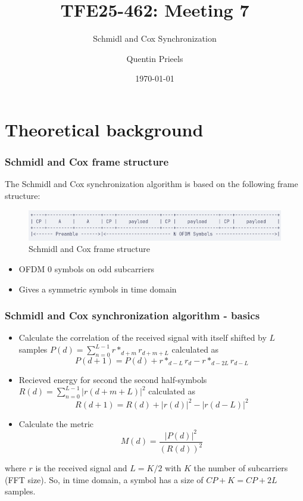\documentclass[10pt]{beamer}
\title{TFE25-462: Meeting 7}
\subtitle{Schmidl and Cox Synchronization}
\author{Quentin Prieels}
\date{\today}
\begin{document}
\maketitle


\section{Theoretical background}

\begin{frame}
    \frametitle{Schmidl and Cox frame structure}
    The Schmidl and Cox synchronization algorithm is based on the following frame structure:
    \begin{figure}
        \centering
        \includegraphics[width=\textwidth]{frame-structure.png}
        \caption{Schmidl and Cox frame structure}
    \end{figure}
    \begin{itemize}
        \item OFDM $0$ symbols on odd subcarriers %
        \item Gives a symmetric symbols in time domain
    \end{itemize}
\end{frame}

\begin{frame}
    \frametitle{Schmidl and Cox synchronization algorithm - basics}
    \begin{itemize}
        \item Calculate the correlation of the received signal with itself shifted by $L$ samples
            $P(d) = \sum_{n=0}^{L-1} r*_{d+m} r_{d+m+L}$
                       calculated as
            \[P(d + 1) = P(d) + r*_{d - L} r_{d} - r*_{d - 2L} r_{d - L}\]
        \item Recieved energy for second the second half-symbols $R(d) = \sum_{n=0}^{L-1} |r(d+m+L)|^2$
            calculated as 
            \[R(d + 1) = R(d) + |r(d)|^2 - |r(d - L)|^2\]
        \item Calculate the metric
            \[M(d) = \frac{|P(d)|^2}{(R(d))^2}\]
    \end{itemize}
    where $r$ is the received signal and $L = K / 2$ with $K$ the number of subcarriers (FFT size). So, in time domain, a symbol has a size of $CP + K = CP + 2L$ samples.
\end{frame}
\end{document}
